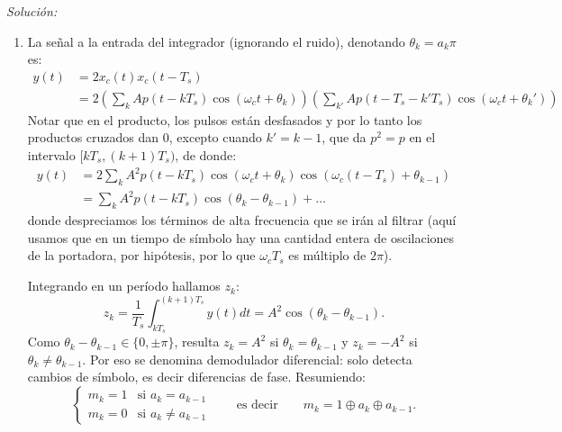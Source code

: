 \documentclass[a4paper,11pt]{article}
\newenvironment{solucion}[1][]{
\noindent \large \textsl{Solución:} \ifthenelse{\equal{#1}{}}{}{\emph{(#1)}}

\smallskip
}{
\bigskip
}
\begin{document}
\begin{solucion}

        \begin{enumerate}
                \item La señal a la entrada del integrador (ignorando el ruido), denotando $\theta_k=a_k\pi$ es:
                \begin{align*}
                        y(t) &= 2x_c(t)x_c(t-T_s) \\
                        &= 2\left(\sum_k Ap(t-kT_s)\cos(\omega_c t + \theta_k)\right)\left(\sum_{k'} Ap(t-T_s-k'T_s)\cos(\omega_c t + \theta_k')\right)
                \end{align*}
                Notar que en el producto, los pulsos están desfasados y por lo tanto los productos cruzados dan $0$, excepto cuando $k'=k-1$, que da $p^2=p$ en el intervalo $[kT_s,(k+1)T_s)$, de donde:
                \begin{align*}
                        y(t) &= 2\sum_k A^2p(t-kT_s)\cos(\omega_c t + \theta_k)\cos(\omega_c (t-T_s) + \theta_{k-1}) \\
                             &= \sum_k A^2p(t-kT_s)\cos(\theta_k-\theta_{k-1}) + \ldots
                \end{align*}
                donde despreciamos los términos de alta frecuencia que se irán al filtrar (aquí usamos que en un tiempo de símbolo hay una cantidad entera de oscilaciones de la portadora, por hipótesis, por lo que $\omega_cT_s$ es múltiplo de $2\pi$).

                Integrando en un período hallamos $z_k$:
                \begin{equation*}
                        z_k = \frac{1}{T_s}\int_{kT_s}^{(k+1)T_s} y(t)dt = A^2\cos(\theta_k-\theta_{k-1}).
                \end{equation*}
                Como $\theta_k-\theta_{k-1}\in\{0,\pm\pi\}$, resulta $z_k = A^2$ si $\theta_k = \theta_{k-1}$ y $z_k=-A^2$ si $\theta_k\neq\theta_{k-1}$. Por eso se denomina demodulador diferencial: solo detecta cambios de símbolo, es decir diferencias de fase.
                Resumiendo:
                \begin{equation*}
                        \begin{cases}
                                m_k = 1 & \text{si }a_k = a_{k-1}\\
                                m_k = 0 & \text{si }a_k \neq a_{k-1}
                        \end{cases}
                        \qquad\text{es decir}\qquad m_k = 1\oplus a_k\oplus a_{k-1}.
                \end{equation*}


\end{enumerate}
\end{solucion}
\end{document}

